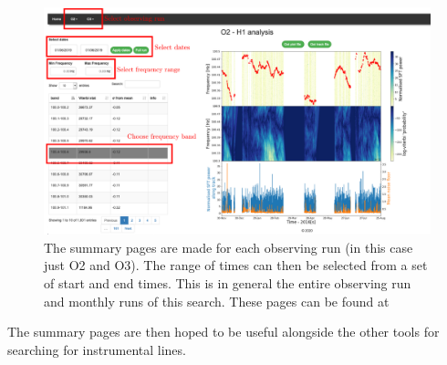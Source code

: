 \begin{figure}
	\centering
	\includegraphics[width=\textwidth]{C5_detchar/summary_annot.pdf}
	\caption[Example summary page for SOAP search]{The summary pages are made for each observing run (in this case just O2 and O3). The range of times can then be selected from a set of start and end times. This is in general the entire observing run and monthly runs of this search. These pages can be found at \citep{bayleyHome}}
	\label{detchar:summary:plots}
\end{figure}

The summary pages are then hoped to be useful alongside the other tools for searching for instrumental lines. 
